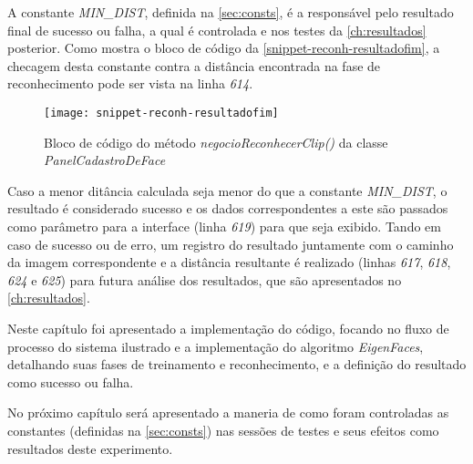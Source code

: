 A constante \textit{MIN\_DIST}, definida na \autoref{sec:consts}, é a responsável pelo resultado final de sucesso ou falha, a qual é controlada e nos testes da \autoref{ch:resultados} posterior. Como mostra o bloco de código da \autoref{snippet-reconh-resultadofim}, a checagem desta constante contra a distância encontrada na fase de reconhecimento pode ser vista na linha \textit{614}.

\begin{figure}[h]
	\centering
	\texttt{[image: snippet-reconh-resultadofim]}
	\caption{Bloco de código do método \textit{negocioReconhecerClip()} da classe \textit{PanelCadastroDeFace}}
	\label{snippet-reconh-resultadofim}
\end{figure}

Caso a menor ditância calculada seja menor do que a constante \textit{MIN\_DIST}, o resultado é considerado sucesso e os dados correspondentes a este são passados como parâmetro para a interface (linha \textit{619}) para que seja exibido. Tando em caso de sucesso ou de erro, um registro do resultado juntamente com o caminho da imagem correspondente e a distância resultante é realizado (linhas \textit{617}, \textit{618}, \textit{624} e \textit{625}) para futura análise dos resultados, que são apresentados no  \autoref{ch:resultados}.




Neste capítulo foi apresentado a implementação do código, focando no fluxo de processo do sistema ilustrado e a implementação do algoritmo \textit{EigenFaces}, detalhando suas fases de treinamento e reconhecimento, e a definição do resultado como sucesso ou falha.

No próximo capítulo será apresentado a maneria de como foram controladas as constantes (definidas na \autoref{sec:consts}) nas sessões de testes e seus efeitos como resultados deste experimento.



%

